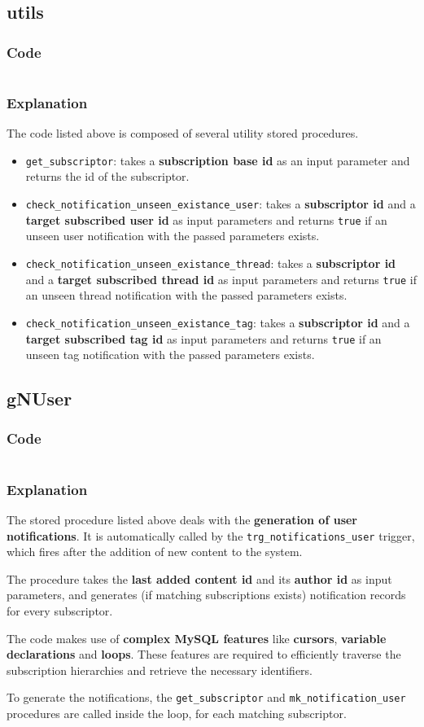 \documentclass[12pt]{report}
\renewcommand\emph{\textbf}
\newcommand{\printSQLtest}[1]
{
    \inputminted[linenos, breaklines, breakbytoken, tabsize=4, fontsize=\footnotesize]{mysql}{#1}
}
\newcommand{\printSQLTablepage}[2]
{
    \newpage
    \subsection{#2}
    \subsubsection{Code}
    \printSQLtest{../sql/parts/#1}
    \subsubsection{Explanation}
}
\begin{document}
                \printSQLTablepage{24_procsUtils.sql}{utils}
                    The code listed above is composed of several utility stored procedures.

                    \begin{itemize}
                        \item \texttt{get_subscriptor}: takes a \emph{subscription base id} as an input parameter and returns the id of the subscriptor.
                        \item \texttt{check_notification_unseen_existance_user}: takes a \emph{subscriptor id} and a \emph{target subscribed user id} as input parameters and returns \texttt{true} if an unseen user notification with the passed parameters exists.
                        \item \texttt{check_notification_unseen_existance_thread}: takes a \emph{subscriptor id} and a \emph{target subscribed thread id} as input parameters and returns \texttt{true} if an unseen thread notification with the passed parameters exists.
                        \item \texttt{check_notification_unseen_existance_tag}: takes a \emph{subscriptor id} and a \emph{target subscribed tag id} as input parameters and returns \texttt{true} if an unseen tag notification with the passed parameters exists.                        
                    \end{itemize}

                \printSQLTablepage{25_procGNUser.sql}{gNUser}
                    The stored procedure listed above deals with the \emph{generation of user notifications}. It is automatically called by the \texttt{trg_notifications_user} trigger, which fires after the addition of new content to the system.

                    The procedure takes the \emph{last added content id} and its \emph{author id} as input parameters, and generates (if matching subscriptions exists) notification records for every subscriptor.

                    The code makes use of \emph{complex MySQL features} like \emph{cursors}, \emph{variable declarations} and \emph{loops}.
                    These features are required to efficiently traverse the subscription hierarchies and retrieve the necessary identifiers.

                    To generate the notifications, the \texttt{get_subscriptor} and \texttt{mk_notification_user} procedures are called inside the loop, for each matching subscriptor.
\end{document}
